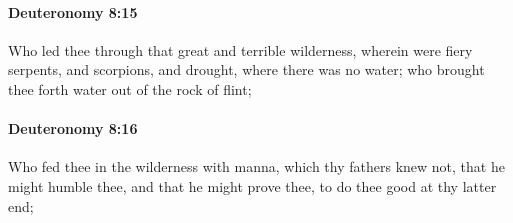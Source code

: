 		\paragraph{Deuteronomy 8:15} %
			\label{DEUTERONOMY-8-15}

			Who led thee through that great and terrible wilderness, wherein were fiery serpents, and scorpions, and drought, where there was no water; who brought thee forth water out of the rock of flint;


		\paragraph{Deuteronomy 8:16} %
			\label{DEUTERONOMY-8-16}

			Who fed thee in the wilderness with manna, which thy fathers knew not, that he might humble thee, and that he might prove thee, to do thee good at thy latter end;

